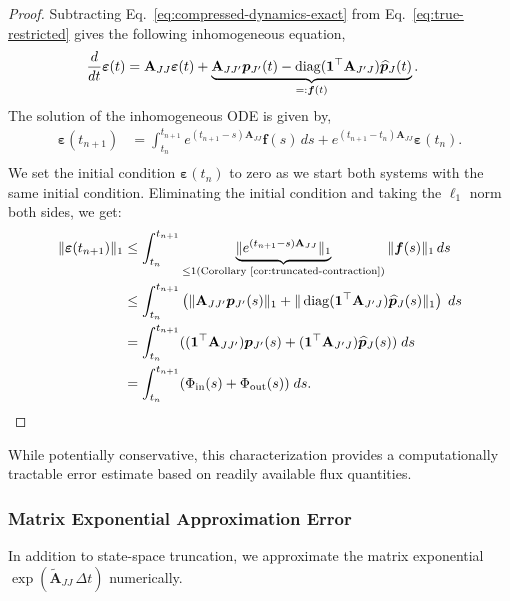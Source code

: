 \documentclass[onefignum,onetabnum]{siamart171218}
\begin{document}
\begin{proof}
Subtracting Eq.~\eqref{eq:compressed-dynamics-exact} from Eq.~\eqref{eq:true-restricted} gives the following inhomogeneous equation,
\begin{align*}
\frac{d}{dt}\boldsymbol{\varepsilon}(t) &= \mathbf{A}_{JJ}\boldsymbol{\varepsilon}(t) + \underbrace{\mathbf{A}_{JJ'}\boldsymbol{p}_{J'}(t) - \operatorname{diag}(\mathbf{1}^\top\mathbf{A}_{J'J})\widehat{\boldsymbol{p}}_J(t)}_{=: \boldsymbol{f}(t)}.
\end{align*}
The solution of the inhomogeneous ODE is given by,
\begin{align}
\boldsymbol{\varepsilon}(t_{n+1}) &= \int_{t_n}^{t_{n+1}} e^{(t_{n+1}-s)\mathbf{A}_{JJ}}\boldsymbol{f}(s) \, ds + e^{(t_{n+1}-t_n)\mathbf{A}_{JJ}}\boldsymbol{\varepsilon}(t_n). \\
\end{align}
We set the initial condition $\boldsymbol{\varepsilon}(t_n)$ to zero as we start both systems with the same initial condition. Eliminating the initial condition and taking the $\ell_1$ norm both sides, we get:
\begin{align}
\|\boldsymbol{\varepsilon}(t_{n+1})\|_1 &\leq \int_{t_n}^{t_{n+1}} \underbrace{\|e^{(t_{n+1}-s)\mathbf{A}_{JJ}}\|_{1}}_{\leq 1 (\text{Corollary \ref{cor:truncated-contraction}})}\|\boldsymbol{f}(s)\|_1 \, ds \\
&\leq \int_{t_n}^{t_{n+1}} \left(\|\mathbf{A}_{JJ'}\boldsymbol{p}_{J'}(s)\|_1  +\|\operatorname{diag}(\mathbf{1}^\top\mathbf{A}_{J'J})\widehat{\boldsymbol{p}}_J(s)\|_1 \right)  \; ds \\
&= \int_{t_n}^{t_{n+1}} ( (\mathbf{1}^\top \mathbf{A}_{JJ'})\boldsymbol{p}_{J'}(s) + (\mathbf{1}^\top\mathbf{A}_{J'J})\widehat{\boldsymbol{p}}_J(s)) \;ds \\
&= \int_{t_n}^{t_{n+1}} (\Phi_{\mathrm{in}}(s) + \Phi_{\mathrm{out}}(s)) \; ds.
\end{align}

\end{proof}

While potentially conservative, this characterization provides a computationally tractable error estimate based on readily available flux quantities.

\subsubsection{Matrix Exponential Approximation Error}
\label{subsec:time_stepping_error_analysis}

In addition to state-space truncation, we approximate the matrix exponential $\exp(\widetilde{\mathbf{A}}_{JJ}\,\Delta t)$ numerically.
\end{document}
